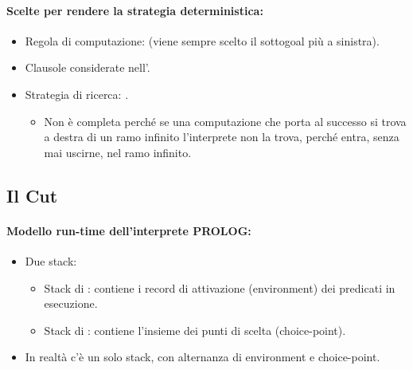 \paragraph{Scelte per rendere la strategia deterministica:}

\begin{itemize}
  \item Regola di computazione:  (viene sempre scelto il sottogoal più a sinistra). 
  \item Clausole considerate nell’. 
  \item Strategia di ricerca: . 
    \begin{itemize}
      \item Non è completa perché se una computazione che porta al successo si trova a destra di un ramo infinito l'interprete non la trova, perché entra, senza mai uscirne, nel ramo infinito.
    \end{itemize}
\end{itemize}


\subsection{Il Cut}



\paragraph{Modello run-time dell'interprete PROLOG:}

\begin{itemize}
  \item Due stack: 
    \begin{itemize}
      \item Stack di : contiene i record di
attivazione (environment) dei predicati in
esecuzione. 
\item Stack di : contiene l'insieme dei punti di scelta (choice-point).
    \end{itemize}
  \item In realtà c'è un solo stack, con alternanza di environment e choice-point.
\end{itemize}

